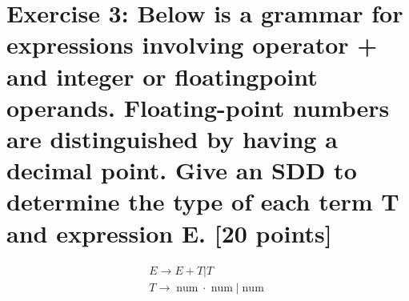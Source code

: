 \documentclass{article}
\begin{document}
    \section{Exercise 3: Below is a grammar for expressions involving operator + and integer or floatingpoint operands. Floating-point numbers are distinguished by having a decimal point. Give
    an SDD to determine the type of each term T and expression E. [20 points]}
    $$
\begin{aligned} E \rightarrow E+T | T \\ T \rightarrow \operatorname{num} \cdot \operatorname{num} | \operatorname{num} \end{aligned}
$$
\end{document}
